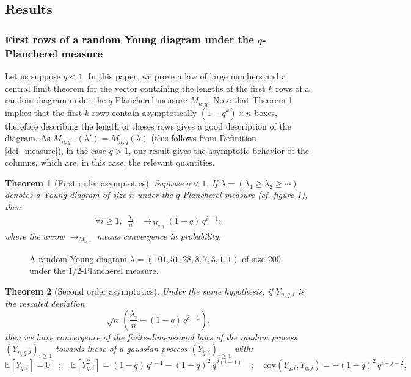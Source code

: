 \documentclass[10pt]{amsart}
\newtheorem{theorem}{Theorem}
\theoremstyle{remark}
\newcommand{\esper}{\mathbb{E}}
\newcommand{\figcap}[2]{\begin{figure}[ht] \begin{center} {\footnotesize{#1}} \caption{#2} \end{center} \end{figure}}
\begin{document}
\subsection{Results}
\subsubsection{First rows of a random Young diagram under the $q$-Plancherel measure}

Let us suppose $q<1$. In this paper, we prove a law of large numbers and a central limit theorem for the vector containing the lengths of the first $k$ rows of a random diagram under the $q$-Plancherel measure $M_{n,q}$. Note that Theorem \ref{th:first_order_as_rows} implies that the first $k$ rows contain asymptotically $(1-q^k) \times n$ boxes, therefore describing the length of theses rows gives a good description of the diagram. As $M_{n,q^{-1}}(\lambda')=M_{n,q}(\lambda)$ (this follows from Definition \ref{def_measure}), in the case $q>1$, our result gives the asymptotic behavior of the columns, which are, in this case, the relevant quantities.

\begin{theorem}[First order asymptotics]\label{th:first_order_as_rows}
Suppose $q<1$. If $\lambda=(\lambda_1\geq \lambda_2\geq \cdots)$ denotes a Young diagram of size $n$ under the $q$-Plancherel measure (\emph{cf.} figure \ref{fig:ex_diag_qplanch}), then
\begin{align*}
\forall i \geq 1,\,\,\,\frac{\lambda_i}{n} & \longrightarrow_{M_{n,q}} (1-q)\,q^{i-1};
\end{align*}
where the arrow $\to_{M_{n,q}}$ means convergence in probability.
\end{theorem}

\figcap{}{A random Young diagram $\lambda=(101,51,28,8,7,3,1,1)$ of size $200$ under the $1/2$-Plancherel measure.\label{fig:ex_diag_qplanch}}

\begin{theorem}[Second order asymptotics]\label{th:second_order_as_rows}
Under the same hypothesis, if $Y_{n,q,i}$ is the rescaled deviation
$$\sqrt{n}\,\left(\frac{\lambda_i}{n} - (1-q)\,q^{i-1}\right),$$
then we have convergence of the finite-dimensional laws of the random process $(Y_{n,q,i})_{i \geq 1}$ towards those of a gaussian process $(Y_{q,i})_{i \geq 1}$ with:
$$\esper[Y_{q,i}]=0 \quad ;\quad \esper[Y_{q,i}^2]=(1-q)\,q^{i-1}-(1-q)^2\,q^{2(i-1)}\quad ;\quad 
\mathrm{cov}(Y_{q,i},Y_{q,j})=-(1-q)^2\,q^{i+j-2}.$$
\end{theorem}\bigskip
\end{document}

